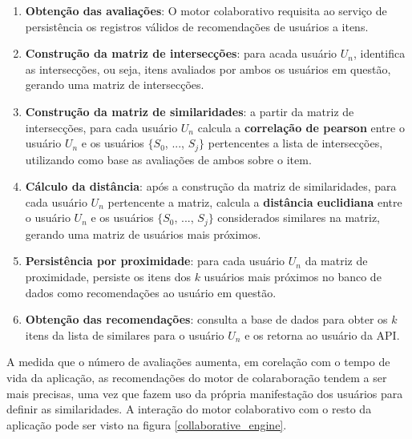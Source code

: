 \documentclass[12pt, openright, oneside, a4paper, brazil]{abntex2}
\begin{document}
\begin{enumerate}
	\item \textbf{Obtenção das avaliações}: O motor colaborativo requisita ao serviço de persistência os registros válidos de recomendações de usuários a itens.

	\item \textbf{Construção da matriz de intersecções}: para acada usuário $U_{n}$, identifica as intersecções, ou seja, itens avaliados por ambos os usuários em questão, gerando uma matriz de intersecções.

	\item \textbf{Construção da matriz de similaridades}: a partir da matriz de intersecções, para cada usuário $U_{n}$ calcula a \textbf{correlação de pearson} entre o usuário $U_{n}$ e os usuários $\lbrace S_{0}$, ..., $S_{j} \rbrace$ pertencentes a lista de intersecções, utilizando como base as avaliações de ambos sobre o item.

	\item \textbf{Cálculo da distância}: após a construção da matriz de similaridades, para cada usuário $U_{n}$ pertencente a matriz, calcula a \textbf{distância euclidiana} entre o usuário $U_{n}$ e os usuários $\lbrace S_{0}$, ..., $S_{j} \rbrace$ considerados similares na matriz, gerando uma matriz de usuários mais próximos.

	\item \textbf{Persistência por proximidade}: para cada usuário $U_{n}$ da matriz de proximidade, persiste os itens dos $k$ usuários mais próximos no banco de dados como recomendações ao usuário em questão.

	\item \textbf{Obtenção das recomendações}: consulta a base de dados para obter os $k$ itens da lista de similares para o usuário $U_{n}$ e os retorna ao usuário da API.
\end{enumerate}

A medida que o número de avaliações aumenta, em corelação com o tempo de vida da aplicação, as recomendações do motor de colaraboração tendem a ser mais precisas, uma vez que fazem uso da própria manifestação dos usuários para definir as similaridades. A interação do motor colaborativo com o resto da aplicação pode ser visto na figura \ref{collaborative_engine}.
\end{document}
